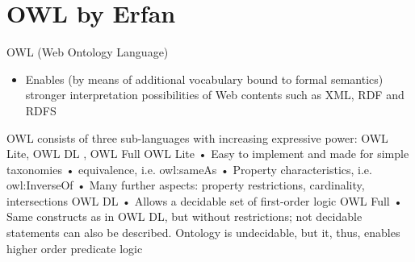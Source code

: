 \documentclass[11pt]{article}
\begin{document}
\section{OWL by Erfan}
\label{sec:org525f555}
OWL (Web Ontology Language)
\begin{itemize}
\item Enables (by means of additional vocabulary bound to formal semantics) stronger interpretation possibilities of Web contents such as XML, RDF and RDFS
\end{itemize}

OWL consists of three sub-languages with increasing expressive power: OWL Lite, OWL DL , OWL Full
OWL Lite • Easy to implement and made for simple taxonomies • equivalence, i.e. owl:sameAs • Property characteristics, i.e. owl:InverseOf • Many further aspects: property restrictions, cardinality, intersections
OWL DL • Allows a decidable set of first-order logic OWL Full • Same constructs as in OWL DL, but without restrictions; not decidable statements can also be described. Ontology is undecidable, but it, thus, enables higher order predicate logic
\end{document}
